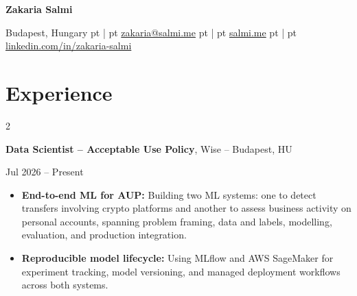 \documentclass[10pt, a4paper]{article}
\newenvironment{highlights}{
    \begin{itemize}[
        topsep=0.10 cm,
        parsep=0.10 cm,
        partopsep=0pt,
        itemsep=0pt,
        leftmargin=10pt
    ]
}{
    \end{itemize}
}
\newenvironment{onecolentry}{\par}{\par}
\newenvironment{twocolentry}[2][]{
    \def\secondColumn{#2}
    \setcolumnwidth{\fill, 4.5 cm}
    \begin{paracol}{2}
}{
    \switchcolumn \raggedleft \secondColumn
    \end{paracol}
}
\newenvironment{header}{
    \centering\linespread{1.5}
}{
    \par
}
\newcommand{\AND}{\kern 5.0 pt | \kern 5.0 pt}
\begin{document}
\begin{header}
    \fontsize{25 pt}{25 pt}\selectfont \textbf{Zakaria Salmi}

    \vspace{5 pt}

    \normalsize
    Budapest, Hungary
    \AND
    \href{mailto:zakaria@salmi.me}{zakaria@salmi.me}
    \AND
    \href{https://salmi.me}{salmi.me}
    \AND
    \href{https://linkedin.com/in/zakaria-salmi}{linkedin.com/in/zakaria-salmi}
\end{header}

\vspace{-0.1cm}

\section{Experience}

\begin{twocolentry}{Jul 2026 -- Present}
    \textbf{Data Scientist -- Acceptable Use Policy}, Wise -- Budapest, HU
\end{twocolentry}
\begin{onecolentry}
    \begin{highlights}
        \item \textbf{End-to-end ML for AUP:} Building two ML systems: one to detect transfers involving crypto platforms and another to assess business activity on personal accounts, spanning problem framing, data and labels, modelling, evaluation, and production integration.
        \item \textbf{Reproducible model lifecycle:} Using MLflow and AWS SageMaker for experiment tracking, model versioning, and managed deployment workflows across both systems.
    \end{highlights}
\end{onecolentry}

\vspace{0.1 cm}
\end{document}
